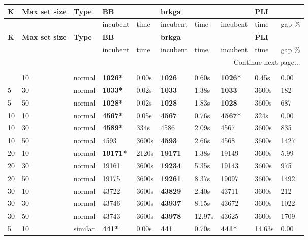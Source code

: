 \begin{scriptsize}
\setlength\LTleft{0pt}            %
\setlength\LTright{0pt}           %
\label{table:tests}
\begin{longtable}{@{\extracolsep{\fill}}l|l|l|ll|ll|lll@{}}
\hline
\textbf{K} & \textbf{Max set size} & \textbf{Type} & \textbf{BB} & & \textbf{brkga} & & & \textbf{PLI}\\ 
\hline
& & & incubent & time & incubent & time & incubent & time & gap \%\\ 
\hline
\endfirsthead
\hline
\textbf{K} & \textbf{Max set size} & \textbf{Type} & \textbf{BB} & & \textbf{brkga} & & & \textbf{PLI}\\ 
\hline
& & & incubent & time & incubent & time & incubent & time & gap \%\\ 
\hline
\endhead
\hline \multicolumn{10}{r}{{Continue next page...}} \\ 
\endfoot
\multicolumn{10}{r}{{}} \\ 
\endlastfoot
 5 & 10 & normal& \textbf{1026*}& 0.00s& \textbf{1026}& 0.60s & \textbf{1026*}& 0.45s & 0.00 \\
 5 & 30 & normal& \textbf{1033*}& 0.02s& \textbf{1033}& 1.38s & \textbf{1033}& 3600s& 182 \\
 5 & 50 & normal& \textbf{1028*}& 0.02s& \textbf{1028}& 1.83s & \textbf{1028}& 3600s& 687 \\
 10 & 10 & normal& \textbf{4567*}& 0.05s& \textbf{4567}& 0.76s & \textbf{4567*}& 324s & 0.00 \\
 10 & 30 & normal& \textbf{4589*}& 334s & 4586& 2.09s & 4567& 3600s& 835 \\
 10 & 50 & normal& 4593& 3600s& \textbf{4593}& 2.66s & 4568& 3600s& 1427 \\
 20 & 10 & normal& \textbf{19171*}& 2120s & \textbf{19171}& 1.38s & 19149& 3600s& 5.99 \\
 20 & 30 & normal& 19161& 3600s& \textbf{19234}& 5.35s & 19143& 3600s& 975 \\
 20 & 50 & normal& 19175& 3600s& \textbf{19261}& 8.37s & 19097& 3600s& 1492 \\
 30 & 10 & normal& 43722& 3600s& \textbf{43829}& 2.40s & 43711& 3600s& 212 \\
 30 & 30 & normal& 43746& 3600s& \textbf{43937}& 8.15s & 43672& 3600s& 1022 \\
 30 & 50 & normal& 43743& 3600s& \textbf{43978}& 12.97s & 43625& 3600s& 1709 \\
 5 & 10 & similar& \textbf{441*}& 0.00s& \textbf{441}& 0.70s & \textbf{441*}& 14.63s & 0.00 \\

\end{longtable}
\end{scriptsize}

